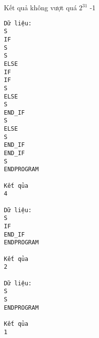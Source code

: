 Kết quả không vượt quá $2^{31}$   -1
\begin{verbatim}
Dữ liệu:
S
IF
S
S
ELSE
IF
IF
S
ELSE
S
END_IF
S
ELSE
S
END_IF
END_IF
S
ENDPROGRAM

Kết qủa
4

Dữ liệu:
S
IF
END_IF
ENDPROGRAM

Kết qủa
2

Dữ liệu:
S
S
ENDPROGRAM

Kết qủa
1
\end{verbatim}